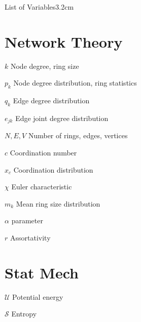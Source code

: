 \begin{mclistof}{List of Variables}{3.2cm}

\section*{Network Theory}

\item[$k$] Node degree, ring size
\item[$p_k$] Node degree distribution, ring statistics
\item[$q_k$] Edge degree distribution
\item[$e_{jk}$] Edge joint degree distribution
\item[$N,E,V$] Number of rings, edges, vertices
\item[$c$] Coordination number
\item[$x_c$] Coordination distribution
\item[$\chi$] Euler characteristic
\item[$m_k$] Mean ring size distribution
\item[$\alpha$] \aw{} parameter
\item[$r$] Assortativity

\section*{Stat Mech}
\item[$\mathcal{U}$] Potential energy
\item[$\mathcal{S}$] Entropy

\end{mclistof} 
